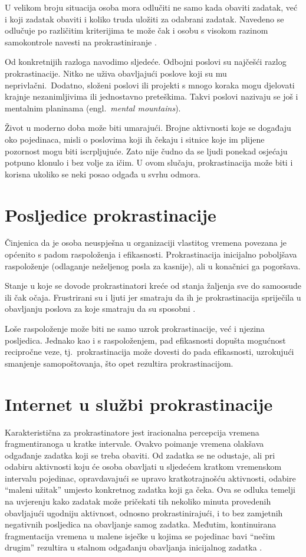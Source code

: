 \documentclass[11pt,twocolumn,english]{article}
\newcommand{\engl}[1]{(engl.~\emph{#1})}
\begin{document}
U velikom broju situacija osoba mora odlučiti ne samo kada obaviti zadatak, već
i koji zadatak obaviti i koliko truda uložiti za odabrani zadatak. 
Navedeno se odlučuje po različitim kriterijima te može čak i osobu s visokom
razinom samokontrole navesti na prokrastiniranje \cite{o2001choice}.

Od konkretnijih razloga \cite{PickBrain5reasons, Lifehack6reasons} navodimo
sljedeće. Odbojni poslovi su najčešći razlog prokrastinacije. Nitko ne uživa
obavljajući poslove koji su mu neprivlačni.~Dodatno, složeni poslovi ili
projekti s mnogo koraka mogu djelovati krajnje nezanimljivima ili jednostavno
preteškima. Takvi poslovi nazivaju se još i mentalnim planinama \engl{mental
mountains}.

Život u moderno doba može biti umarajući. Brojne aktivnosti koje se
događaju oko pojedinaca, misli o poslovima koji ih čekaju i sitnice koje im
plijene pozornost mogu biti iscrpljujuće. Zato nije čudno da se ljudi ponekad
osjećaju potpuno klonulo i bez volje za ičim. U ovom slučaju,
prokrastinacija može biti i korisna ukoliko se neki posao odgađa u svrhu odmora.


\section{Posljedice prokrastinacije}
Činjenica da je osoba neuspješna u organizaciji vlastitog vremena povezana je
općenito s padom raspoloženja i efikasnosti. Prokrastinacija inicijalno
poboljšava raspoloženje (odlaganje neželjenog posla za kasnije), ali u
konačnici ga pogoršava.

Stanje u koje se dovode prokrastinatori kreće od
stanja žaljenja sve do samoosude ili čak očaja. Frustrirani su i ljuti jer
smatraju da ih je prokrastinacija spriječila u obavljanju poslova za koje
smatraju da su sposobni \cite{burka2004procrastination}.

Loše raspoloženje može biti ne samo uzrok prokrastinacije,
već i njezina posljedica. Jednako kao i s raspoloženjem, pad efikasnosti
dopušta mogućnost recipročne veze, tj.~prokrastinacija može dovesti do pada
efikasnosti, uzrokujući smanjenje samopoštovanja, što opet rezultira prokrastinacijom.


\section{Internet u službi prokrastinacije}
Karakteristična za prokrastinatore jest iracionalna percepcija vremena
fragmentiranoga u kratke intervale. Ovakvo poimanje vremena olakšava odgađanje
zadatka koji se treba obaviti. Od zadatka se ne odustaje, ali pri odabiru
aktivnosti koju će osoba obavljati u sljedećem kratkom vremenskom intervalu
pojedinac, opravdavajući se upravo kratkotrajnošću aktivnosti, odabire ``maleni
užitak'' umjesto konkretnog zadatka koji ga čeka. Ova se odluka temelji na
uvjerenju kako zadatak može pričekati tih nekoliko minuta provedenih obavljajući
ugodniju aktivnost, odnosno prokrastinirajući, i to bez zamjetnih negativnih
posljedica na obavljanje samog zadatka. Međutim, kontinuirana fragmentacija
vremena u malene isječke u kojima se pojedinac bavi ``nečim drugim'' rezultira u
stalnom odgađanju obavljanja inicijalnog zadatka \cite{Online08thatchera}.
\end{document}
